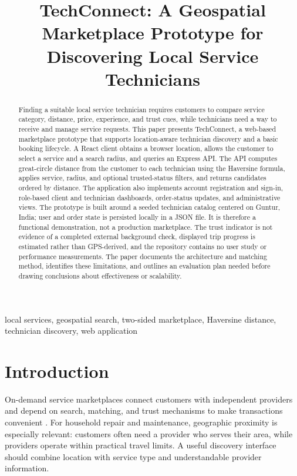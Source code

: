\documentclass[conference]{IEEEtran}
\title{TechConnect: A Geospatial Marketplace Prototype for Discovering Local Service Technicians}
\author{
\IEEEauthorblockN{[Author Name(s)]}
\IEEEauthorblockA{[Department and Institution]\\
[City, Country]\\
[Email address(es)]}
}
\begin{document}
\maketitle

\begin{abstract}
Finding a suitable local service technician requires customers to compare service category, distance, price, experience, and trust cues, while technicians need a way to receive and manage service requests. This paper presents TechConnect, a web-based marketplace prototype that supports location-aware technician discovery and a basic booking lifecycle. A React client obtains a browser location, allows the customer to select a service and a search radius, and queries an Express API. The API computes great-circle distance from the customer to each technician using the Haversine formula, applies service, radius, and optional trusted-status filters, and returns candidates ordered by distance. The application also implements account registration and sign-in, role-based client and technician dashboards, order-status updates, and administrative views. The prototype is built around a seeded technician catalog centered on Guntur, India; user and order state is persisted locally in a JSON file. It is therefore a functional demonstration, not a production marketplace. The trust indicator is not evidence of a completed external background check, displayed trip progress is estimated rather than GPS-derived, and the repository contains no user study or performance measurements. The paper documents the architecture and matching method, identifies these limitations, and outlines an evaluation plan needed before drawing conclusions about effectiveness or scalability.
\end{abstract}

\begin{IEEEkeywords}
local services, geospatial search, two-sided marketplace, Haversine distance, technician discovery, web application
\end{IEEEkeywords}

\section{Introduction}
On-demand service marketplaces connect customers with independent providers and depend on search, matching, and trust mechanisms to make transactions convenient \cite{einav2016}. For household repair and maintenance, geographic proximity is especially relevant: customers often need a provider who serves their area, while providers operate within practical travel limits. A useful discovery interface should combine location with service type and understandable provider information.
\end{document}
